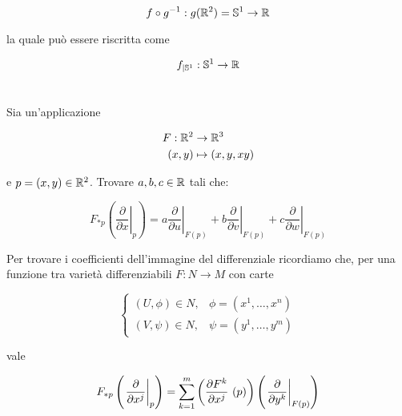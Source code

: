 \begin{equation}
	f \circ g^{-1} : g(\mathbb{R}^{2}) = \mathbb{S}^{1} \to \mathbb{R}
\end{equation}

la quale può essere riscritta come

\begin{equation}
	f_{|\mathbb{S}^{1}} : \mathbb{S}^{1} \to \mathbb{R}
\end{equation}

%

\newpage

%

\section{}\label{es2-8}

\begin{tcolorbox}
	Sia un'applicazione
	
	\begin{align}
		\begin{split}
			F : \mathbb{R}^{2} &\to \mathbb{R}^{3}\\
			(x,y) &\mapsto (x,y,xy)
		\end{split}
	\end{align}
	
	e $ p = (x,y) \in \mathbb{R}^{2} $. Trovare $ a,b,c \in \mathbb{R} $ tali che:
	
	\begin{equation}
		F_{*p} \left( \left. \dfrac{\partial}{\partial x} \right|_{p} \right) = a \left. \dfrac{\partial}{\partial u} \right|_{F(p)} + b \left. \dfrac{\partial}{\partial v} \right|_{F(p)} + c \left. \dfrac{\partial}{\partial w} \right|_{F(p)}
	\end{equation}
\end{tcolorbox}

Per trovare i coefficienti dell'immagine del differenziale ricordiamo che, per una funzione tra varietà differenziabili $ F : N \to M $ con carte

\begin{equation}
	\begin{cases}
		(U,\phi) \in N, & \phi = (x^{1},\dots,x^{n})\\
		(V,\psi) \in N, & \psi = (y^{1},\dots,y^{m})
	\end{cases}
\end{equation}

vale

\begin{equation}
	F_{*p} \left( \eval{\pdv{x^{j}}}_{p} \right) = \sum_{k=1}^{m} \left( \pdv{F^{k}}{x^{j}}\ (p) \right) \left( \eval{\pdv{y^{k}}}_{F(p)} \right)
\end{equation}

